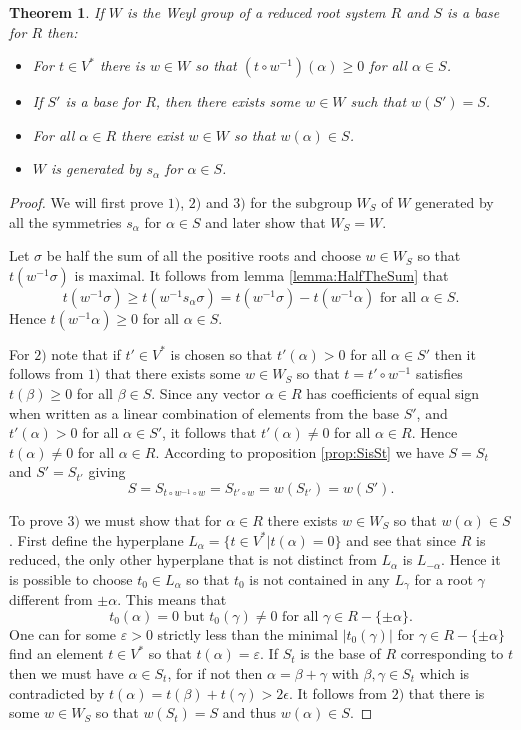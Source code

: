 \documentclass[twoside,utf8]{article}
\theoremstyle{plain}
\newtheorem{theorem}{Theorem}
\theoremstyle{definition}
\theoremstyle{remark}
\begin{document}
\begin{theorem} \label{thm:FourPoints}
If $W$ is the Weyl group of a reduced root system $R$ and $S$ is a base for $R$ then:
\begin{itemize}
\item[1)] For $t\in V^*$ there is $w\in W$ so that $(t \circ w^{-1})(\alpha)\geq 0$ for all $\alpha \in S$.
\item[2)] If $S'$ is a base for $R$, then there exists some $w \in W$ such that $w(S')=S$.
\item[3)] For all $\alpha \in R$ there exist $w \in W$ so that $w(\alpha)\in S$.
\item[4)] $W$ is generated by $s_\alpha$ for $\alpha \in S$.
\end{itemize}
\end{theorem}
\begin{proof}
We will first prove $1)$, $2)$ and $3)$ for the subgroup $W_S$ of $W$ generated by all the symmetries $s_\alpha$ for $\alpha \in S$ and later show that $W_S=W$.

Let $\sigma$ be half the sum of all the positive roots and choose $w\in W_S$ so that $t(w^{-1}\sigma)$ is maximal. It follows from lemma \ref*{lemma:HalfTheSum} that
\[
t(w^{-1}\sigma)\geq t(w^{-1}s_\alpha \sigma) = t(w^{-1} \sigma)-t(w^{-1} \alpha) \mbox{ for all } \alpha \in S.
\]
Hence $t(w^{-1} \alpha)\geq 0$ for all $\alpha \in S$.

For $2)$ note that if $t'\in V^*$ is chosen so that $t'(\alpha)>0$ for all $\alpha \in S'$ then it follows from $1)$ that there exists some $w\in W_S$ so that $t=t'\circ w^{-1}$ satisfies $t(\beta)\geq 0$ for all $\beta \in S$. Since any vector $\alpha \in R$ has coefficients of equal sign when written as a linear combination of elements from the base $S'$, and $t'(\alpha)>0$ for all $\alpha \in S'$, it follows that $t'(\alpha)\neq 0$ for all $\alpha \in R$.
Hence $t(\alpha) \neq 0$ for all $\alpha \in R$. According to proposition \ref*{prop:SisSt} we have $S=S_t$ and $S'=S_{t'}$ giving 
\[
S
=S_{t\circ w^{-1} \circ w}
=S_{t' \circ w}
=w(S_{t'})
=w(S').
\]

To prove $3)$ we must show that for $\alpha \in R$ there exists $w\in W_S$ so that $w(\alpha) \in S$. First define the hyperplane $L_\alpha = \{ t \in V^* | t(\alpha)=0 \}$ and see that since $R$ is reduced, the only other hyperplane that is not distinct from $L_\alpha$ is $L_{-\alpha}$. Hence it is possible to choose $t_0\in L_\alpha$ so that $t_0$ is not contained in any $L_\gamma$ for a root $\gamma$ different from $\pm \alpha$. This means that
\[
t_0(\alpha)=0 \mbox{ but } t_0(\gamma)\neq 0 \mbox{ for all } \gamma \in R-\{\pm \alpha\}.
\]
One can for some $\varepsilon>0$ strictly less than the minimal $|t_0(\gamma)|$ for $\gamma \in R-\{\pm \alpha\}$ find an element $t \in V^*$ so that $t(\alpha)=\varepsilon$. If $S_{t}$ is the base of $R$ corresponding to $t$ then we must have $\alpha\in S_{t}$, for if not then $\alpha = \beta + \gamma$ with $\beta,\gamma\in S_{t}$ which is contradicted by $t(\alpha)=t(\beta)+t(\gamma)>2\epsilon$. It follows from $2)$ that there is some $w\in W_S$ so that $w(S_t)=S$ and thus $w(\alpha) \in S$.


\end{proof}
\end{document}
